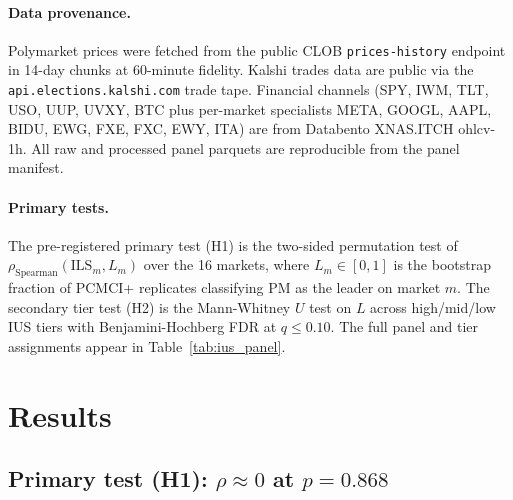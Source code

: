 \documentclass{article}
\begin{document}
\paragraph{Data provenance.}
Polymarket prices were fetched from the public CLOB \texttt{prices-history} endpoint in 14-day chunks at 60-minute fidelity. Kalshi trades data are public via the \texttt{api.elections.kalshi.com} trade tape. Financial channels (SPY, IWM, TLT, USO, UUP, UVXY, BTC plus per-market specialists META, GOOGL, AAPL, BIDU, EWG, FXE, FXC, EWY, ITA) are from Databento XNAS.ITCH ohlcv-1h. All raw and processed panel parquets are reproducible from the panel manifest.

\paragraph{Primary tests.}
The pre-registered primary test (H1) is the two-sided permutation test of $\rho_{\text{Spearman}}(\mathrm{ILS}_m, L_m)$ over the 16 markets, where $L_m \in [0,1]$ is the bootstrap fraction of PCMCI+ replicates classifying PM as the leader on market $m$. The secondary tier test (H2) is the Mann-Whitney $U$ test \citep{mann1947test} on $L$ across high/mid/low IUS tiers with Benjamini-Hochberg FDR \citep{benjamini1995controlling} at $q \le 0.10$. The full panel and tier assignments appear in Table~\ref{tab:ius_panel}.

\begin{table}[t]
\centering
\caption{Pre-registered 16-market IUS panel. Tier classifications were frozen prior to ILS or causal-discovery computation. ILS is the Information Leadership Score (Definition~\ref{def:ils}) with block-bootstrap 95\% CI. $L$ is the bootstrap leadership score (fraction of PCMCI+ replicates classifying PM as leader) used in H1.}
\label{tab:ius_panel}
\small

\end{table}

\section{Results}
\label{sec:results}

\subsection{Primary test (H1): $\rho \approx 0$ at $p = 0.868$}
\end{document}
